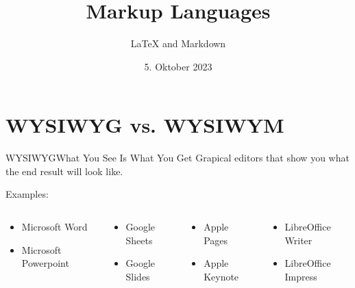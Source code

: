 \documentclass{setbeamer}
\title{Markup Languages}
\subtitle{\LaTeX{} and Markdown}
\institute{\theChairName\\\theDepartmentName\\\theUniversityName}
\date[05.10.2023]{5. Oktober 2023}
\begin{document}
\maketitle



\section{WYSIWYG vs. WYSIWYM}
\begin{frame}{WYSIWYG}{What You See Is What You Get}
    Grapical editors that show you what the end result will look like.

    Examples:
    \begin{columns}
        \begin{column}{0.25\textwidth}
            \begin{itemize}
                \item Microsoft Word
                \item Microsoft Powerpoint
            \end{itemize}
        \end{column}

        \begin{column}{0.25\textwidth}
            \begin{itemize}
                \item Google Sheets
                \item Google Slides
            \end{itemize}
        \end{column}

        \begin{column}{0.25\textwidth}
            \begin{itemize}
                \item Apple Pages
                \item Apple Keynote
            \end{itemize}
        \end{column}

        \begin{column}{0.25\textwidth}
            \begin{itemize}
                \item LibreOffice Writer
                \item LibreOffice Impress
            \end{itemize}
        \end{column}
    \end{columns}


\end{frame}
\end{document}
